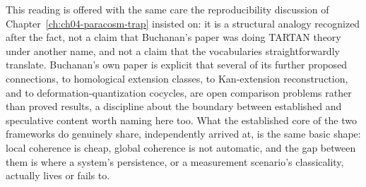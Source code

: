 This reading is offered with the same care the reproducibility discussion of Chapter~\ref{ch:ch04-paracosm-trap} insisted on: it is a structural analogy recognized after the fact, not a claim that Buchanan's paper was doing TARTAN theory under another name, and not a claim that the vocabularies straightforwardly translate. Buchanan's own paper is explicit that several of its further proposed connections, to homological extension classes, to Kan-extension reconstruction, and to deformation-quantization cocycles, are open comparison problems rather than proved results, a discipline about the boundary between established and speculative content worth naming here too. What the established core of the two frameworks do genuinely share, independently arrived at, is the same basic shape: local coherence is cheap, global coherence is not automatic, and the gap between them is where a system's persistence, or a measurement scenario's classicality, actually lives or fails to.
